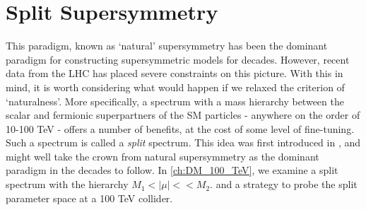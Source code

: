 \section{Split Supersymmetry}
This paradigm, known as `natural' supersymmetry  has been the dominant paradigm for constructing supersymmetric models for decades. However, recent data from the LHC has placed severe constraints on this picture. With this in mind, it is worth considering what would happen if we relaxed the criterion of `naturalness'. More specifically, a spectrum with a mass hierarchy between the scalar and fermionic superpartners of the SM particles - anywhere on the order of 10-100 TeV - offers a number of benefits, at the cost of some level of fine-tuning. Such a spectrum is called a \emph{split} spectrum. This idea was first introduced in \citep{Wells:2003tf,Arkani-Hamed2005,Giudice2005}, and might well take the crown from natural supersymmetry as the dominant paradigm in the decades to follow. In \autoref{ch:DM_100_TeV}, we examine a split spectrum with the hierarchy $M_1 < |\mu| << M_2$. and a strategy to probe the split parameter space at a 100 TeV collider.
